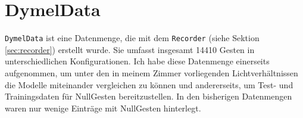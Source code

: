 \section{DymelData}
\label{sec:DymelData}
\texttt{DymelData} ist eine Datenmenge, die mit dem \texttt{Recorder} (siehe Sektion \ref{sec:recorder}) erstellt wurde. Sie umfasst insgesamt 14410 Gesten in unterschiedlichen Konfigurationen. Ich habe diese Datenmenge
einerseits aufgenommen, um unter den in meinem Zimmer vorliegenden Lichtverhältnissen die Modelle miteinander vergleichen zu können und andererseits, um Test- und Trainingsdaten für NullGesten bereitzustellen. In den
bisherigen Datenmengen waren nur wenige Einträge mit NullGesten hinterlegt.



